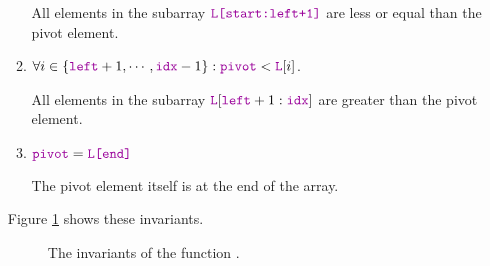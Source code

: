 \begin{enumerate}
\begin{enumerate}
            All elements in the subarray $\mytt{L[start:left+1]}$ are less or equal than the pivot element.
      \item $\forall i \in \{ \mytt{left}+1,\cdots,\mytt{idx}-1\}:\mytt{pivot} < \mytt{L}[i]$.

            All elements in the subarray $\mytt{L}[\mytt{left}+1:\mytt{idx}]$ are greater than the pivot
            element.
      \item $\mytt{pivot} = \mytt{L[end]}$

            The pivot element itself is at the end of the array.
      \end{enumerate}
      Figure \ref{fig:lomuto.png} shows these invariants.

\begin{figure}[!ht]
  \centering
  \caption{The invariants of the function .}
  \label{fig:lomuto.png}
\end{figure}



\end{enumerate}
